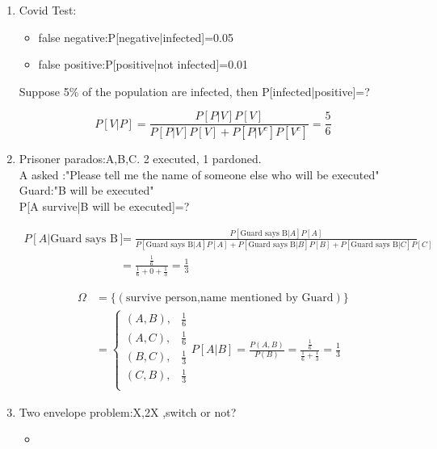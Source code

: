 \begin{example}[]{}
 \begin{enumerate}[label=\circled{\arabic*}] 
 \item Covid Test:\begin{itemize}
 \item false negative:P[negative|infected]=0.05
 \item false positive:P[positive|not infected]=0.01
 \end{itemize}
 Suppose 5\% of the population are infected, then P[infected|positive]=?
 \\\begin{solution}
   $$ P[V|P]=\frac{P[P|V]P[V]}{P[P|V]P[V]+P[P|V^c]P[V^c]}=\frac{5}{6}$$
 \end{solution}
 \item Prisoner parados:A,B,C. 2 executed, 1 pardoned.
 \\A asked :"Please tell me the name of someone else who will be executed"
 \\Guard:"B will be executed"
 \\P[A survive|B will be executed]=?
 \begin{solution}
    \begin{align*}{}{}
    P[A|\text{Guard says B}]&=\frac{P[\text{Guard says B}|A]P[A]}{P[\text{Guard says B}|A]P[A]+P[\text{Guard says B}|B]P[B]+P[\text{Guard says B}|C]P[C]}\\
    &=\frac{\frac{1}{6}}{\frac{1}{6}+0+\frac{1}{3}}=\frac{1}{3}
    \end{align*}
\begin{solution}
    \begin{align*}{}{}
    \Omega&=\{(\text{survive person,name mentioned by Guard})\}\\
    &=\begin{cases}
        (A,B),&\frac{1}{6}\\
        (A,C),&\frac{1}{6}\\
        (B,C),&\frac{1}{3}\\
        (C,B),&\frac{1}{3}\\
    \end{cases}
    P[A|B]=\frac{P(A,B)}{P(B)}=\frac{\frac{1}{6}}{\frac{1}{6}+\frac{1}{3}}=\frac{1}{3}
    \end{align*}
\end{solution}
 \end{solution}
 \item Two envelope problem:X,2X ,switch or not?
 \begin{itemize}
 \item 
 \end{itemize}
 \end{enumerate}
\end{example}
